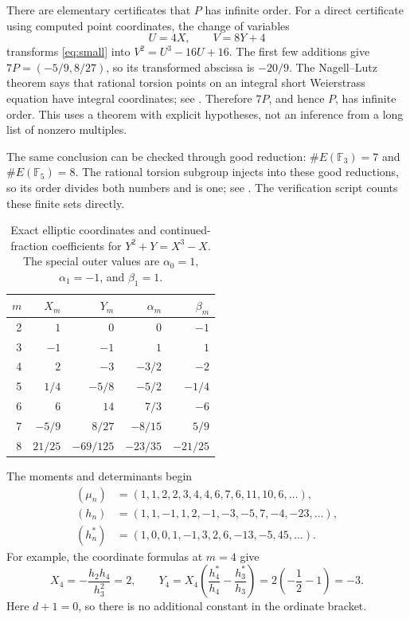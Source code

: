 \documentclass[11pt,letterpaper]{article}
\numberwithin{equation}{section}
\theoremstyle{definition}
\theoremstyle{remark}
\begin{document}
There are elementary certificates that $P$ has infinite order.
For a direct certificate using computed point coordinates, the change
of variables
\[
 U=4X,\qquad V=8Y+4
\]
transforms \eqref{eq:small} into $V^2=U^3-16U+16$.
The first few additions give $7P=(-5/9,8/27)$, so its transformed
abscissa is $-20/9$. The Nagell--Lutz theorem says that rational torsion
points on an integral short Weierstrass equation have integral
coordinates; see \cite[Theorem~24.21]{Sutherland2013}. Therefore $7P$,
and hence $P$, has infinite order. This uses a theorem with explicit
hypotheses, not an inference from a long list of nonzero multiples.

The same conclusion can be checked through good reduction:
$\#E(\mathbb F_3)=7$ and $\#E(\mathbb F_5)=8$.
The rational torsion subgroup injects into these good reductions, so its
order divides both numbers and is one; see
\cite[Corollary~24.19]{Sutherland2013}. The verification script counts
these finite sets directly.

\begin{table}[ht]
\centering
\renewcommand{\arraystretch}{1.16}
\begin{tabular}{@{}rrrrr@{}}
\toprule
$m$ & $X_m$ & $Y_m$ & $\alpha_m$ & $\beta_m$\\
\midrule
2 & $1$ & $0$ & $0$ & $-1$\\
3 & $-1$ & $-1$ & $1$ & $1$\\
4 & $2$ & $-3$ & $-3/2$ & $-2$\\
5 & $1/4$ & $-5/8$ & $-5/2$ & $-1/4$\\
6 & $6$ & $14$ & $7/3$ & $-6$\\
7 & $-5/9$ & $8/27$ & $-8/15$ & $5/9$\\
8 & $21/25$ & $-69/125$ & $-23/35$ & $-21/25$\\
\bottomrule
\end{tabular}
\caption{Exact elliptic coordinates and continued-fraction coefficients for
$Y^2+Y=X^3-X$. The special outer values are
$\alpha_0=1$, $\alpha_1=-1$, and $\beta_1=1$.}
\label{tab:small}
\end{table}

The moments and determinants begin
\begin{align*}
 (\mu_n)&=(1,1,2,2,3,4,4,6,7,6,11,10,6,\ldots),\\
 (h_n)&=(1,1,-1,1,2,-1,-3,-5,7,-4,-23,\ldots),\\
 (h_n^*)&=(1,0,0,1,-1,3,2,6,-13,-5,45,\ldots).
\end{align*}
For example, the coordinate formulas at $m=4$ give
\[
 X_4=-\frac{h_2h_4}{h_3^2}=2,\qquad
 Y_4=X_4\left(\frac{h_4^*}{h_4}-\frac{h_3^*}{h_3}\right)
     =2\left(-\frac12-1\right)=-3.
\]
Here $d+1=0$, so there is no additional constant in the ordinate bracket.
\end{document}
